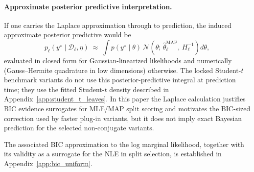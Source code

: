 \documentclass[10pt]{article} %
\begin{document}
\paragraph{Approximate posterior predictive interpretation.}
If one carries the Laplace approximation through to prediction, the induced approximate posterior predictive would be
\[
p_\ell(y^\star\mid \mathcal{D}_\ell,\eta) \;\approx\; \int p(y^\star\mid\theta)\,\mathcal{N}\!\left(\theta;\,\hat{\theta}_\ell^{\mathrm{MAP}},\, H_\ell^{-1}\right) d\theta,
\]
evaluated in closed form for Gaussian-linearized likelihoods and numerically (Gauss--Hermite quadrature in low dimensions) otherwise. The locked Student-$t$ benchmark variants do not use this posterior-predictive integral at prediction time; they use the fitted Student-$t$ density described in Appendix~\ref{app:student_t_leaves}. In this paper the Laplace calculation justifies BIC evidence surrogates for MLE/MAP split scoring and motivates the BIC-sized correction used by faster plug-in variants, but it does not imply exact Bayesian prediction for the selected non-conjugate variants.

The associated BIC approximation to the log marginal likelihood, together with its validity as a surrogate for the NLE in split selection, is established in Appendix~\ref{app:bic_uniform}.






\end{document}

